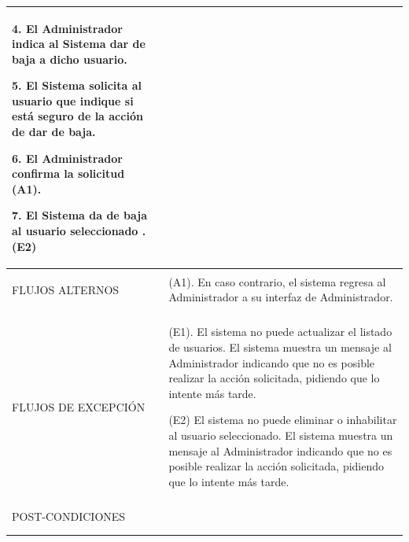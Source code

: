 \begin{longtable}{@{\extracolsep{8pt}}l p{8.5cm}}
 4. El Administrador indica al Sistema dar de baja a dicho usuario. \par\vspace{.1cm}

 5. El Sistema solicita al usuario que indique si está seguro de la acción de dar de baja. \par\vspace{.1cm}

 6. El Administrador confirma la solicitud (A1). \par\vspace{.1cm}

 7. El Sistema da de baja al usuario seleccionado .(E2) \par\vspace{.1cm}

\\
\hline \\[-1ex]

FLUJOS ALTERNOS & 
\par (A1). En caso contrario, el sistema regresa al Administrador a su interfaz de Administrador.



\\
\hline \\[-1ex]

FLUJOS DE EXCEPCIÓN & 
\par\vspace{.1cm} (E1). El sistema no puede actualizar el listado de usuarios. El sistema muestra un mensaje al Administrador indicando que no es posible realizar la acción solicitada, pidiendo que lo intente más tarde.

\par\vspace{.1cm} (E2) El sistema no puede eliminar o inhabilitar al usuario seleccionado. El sistema muestra un mensaje al Administrador indicando que no es posible realizar la acción solicitada, pidiendo que lo intente más tarde.


\\%

\hline \\[-1ex]
POST-CONDICIONES & 
\\
\hline
\hline \\[-1.8ex]
 \\
\end{longtable}


\pagebreak





